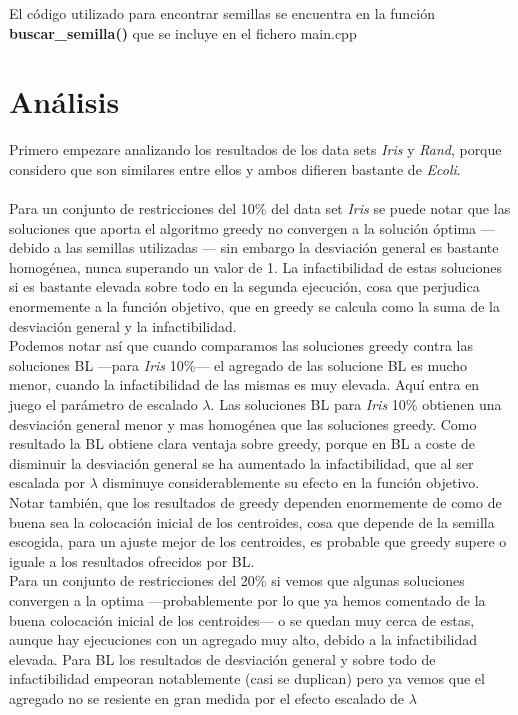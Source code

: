 El código utilizado para encontrar semillas se encuentra en la función \textbf{buscar\_semilla()} que se incluye en el fichero main.cpp


\section{Análisis}
Primero empezare analizando los resultados de los data sets \emph{Iris} y \emph{Rand}, porque considero que son similares entre ellos y ambos difieren bastante de \emph{Ecoli}.\\
\\
Para un conjunto de restricciones del 10\% del data set \emph{Iris} se puede notar que las soluciones que aporta el algoritmo greedy no convergen a la solución óptima --- debido a las semillas utilizadas --- sin embargo la desviación general es bastante homogénea, nunca superando un valor de 1. La infactibilidad de estas soluciones si es bastante elevada sobre todo en la segunda ejecución, cosa que perjudica enormemente a la función objetivo, que en greedy se calcula como la suma de la desviación general y la infactibilidad. \\
Podemos notar así que cuando comparamos las soluciones greedy contra las soluciones BL ---para \emph{Iris} 10\%--- el agregado de las solucione BL es mucho menor, cuando la infactibilidad de las mismas es muy elevada. Aquí entra en juego el parámetro de escalado $ \lambda $. Las soluciones BL para \emph{Iris} 10\% obtienen una desviación general menor y mas homogénea que las soluciones greedy. Como resultado la BL obtiene clara ventaja sobre greedy, porque en BL a coste de disminuir la desviación general se ha aumentado la infactibilidad, que al ser escalada por $ \lambda $ disminuye considerablemente su efecto en la función objetivo. Notar también, que los resultados de greedy dependen enormemente de como de buena sea la colocación inicial de los centroides, cosa que depende de la semilla escogida, para un ajuste mejor de los centroides, es probable que greedy supere o iguale a los resultados ofrecidos por BL.\\
Para un conjunto de restricciones del 20\% si vemos que algunas soluciones convergen a la optima ---probablemente por lo que ya hemos comentado de la buena colocación inicial de los centroides--- o se quedan muy cerca de estas, aunque hay ejecuciones con un agregado muy alto, debido a la infactibilidad elevada. Para BL los resultados de desviación general y sobre todo de infactibilidad empeoran notablemente (casi se duplican) pero ya vemos que el agregado no se resiente en gran medida por el efecto escalado de $ \lambda $\\
